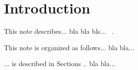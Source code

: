 \section{Introduction}
This note describes... bla bla bls... 
~\cite{Author:Link}. 

This note is organized as follows... bla bla... 

... is described in Sections .. bla bla...
